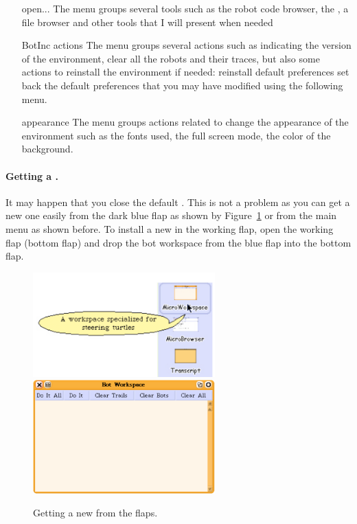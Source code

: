 \begin{itemize}
\item[open...] The menu  groups several tools such as the robot code browser, the \tw, a file browser and other tools that I will present when needed
\item [BotInc actions] The menu  groups several actions such as indicating the version of the environment, clear all the robots and their traces, but also some actions to reinstall the environment if needed: reinstall default preferences set back the default preferences that you may have modified using the following menu. 
\item [appearance] The menu  groups actions related to change the appearance of the environment such as the fonts used, the full screen mode, the color of the background.
\end{itemize}


\paragraph{Getting a \tw.}
It may happen that you close the default \tw. This is not a problem as you can get a new one easily from the dark blue flap as shown by Figure~\ref{fig:caroflaps} or from the main menu as shown before. To install a new \tw in the working flap, open the working flap (bottom flap) and drop the bot workspace from the blue flap into the bottom flap. 

\begin{figure}
\begin{center}
\includegraphics[width=7cm]{smallcaroflap}\hfill\includegraphics[width=7cm]{FullTurtleWorkspace}
\caption{Getting a new \tw from the flaps. \label{fig:caroflaps}}
\end{center}
\end{figure}

